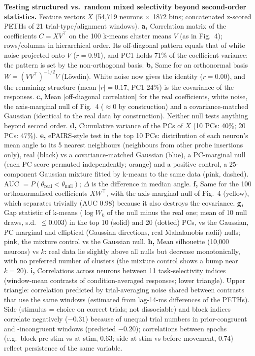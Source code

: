 \caption{\textbf{Testing structured vs.\ random mixed selectivity beyond second-order statistics.}
Feature vectors $X$ (54{,}719 neurons $\times$ 1872 bins; concatenated z-scored PETHs of 21 trial-type/alignment windows).
\textbf{a,} Correlation matrix of the coefficients $C = XV^\top$ on the 100 k-means cluster means $V$ (as in Fig.~4); rows/columns in hierarchical order. Its off-diagonal pattern equals that of white noise projected onto $V$ ($r = 0.91$), and PC1 holds 71\% of the coefficient variance: the pattern is set by the non-orthogonal basis.
\textbf{b,} Same for an orthonormal basis $W = (VV^\top)^{-1/2}V$ (L\"owdin). White noise now gives the identity ($r = 0.00$), and the remaining structure (mean $|r| = 0.17$, PC1 24\%) is the covariance of the responses.
\textbf{c,} Mean $|$off-diagonal correlation$|$ for the real coefficients, white noise, the axis-marginal null of Fig.~4 ($\approx 0$ by construction) and a covariance-matched Gaussian (identical to the real data by construction). Neither null tests anything beyond second order.
\textbf{d,} Cumulative variance of the PCs of $X$ (10 PCs: 40\%; 20 PCs: 47\%).
\textbf{e,} ePAIRS-style test in the top 10 PCs: distribution of each neuron's mean angle to its 5 nearest neighbours (neighbours from other probe insertions only), real (black) vs a covariance-matched Gaussian (blue), a PC-marginal null (each PC score permuted independently; orange) and a positive control, a 25-component Gaussian mixture fitted by k-means to the same data (pink, dashed). AUC $=P(\theta_\mathrm{real}<\theta_\mathrm{null})$; $\Delta$ is the difference in median angle.
\textbf{f,} Same for the 100 orthonormalised coefficients $XW^\top$, with the axis-marginal null of Fig.~4 (yellow), which separates trivially (AUC 0.98) because it also destroys the covariance.
\textbf{g,} Gap statistic of k-means ($\log W_k$ of the null minus the real one; mean of 10 null draws, s.d.\ $\le 0.003$) in the top 10 (solid) and 20 (dotted) PCs, vs the Gaussian, PC-marginal and elliptical (Gaussian directions, real Mahalanobis radii) nulls; pink, the mixture control vs the Gaussian null.
\textbf{h,} Mean silhouette (10{,}000 neurons) vs $k$: real data lie slightly above all nulls but decrease monotonically, with no preferred number of clusters (the mixture control shows a bump near $k=20$).
\textbf{i,} Correlations across neurons between 11 task-selectivity indices (window-mean contrasts of condition-averaged responses; lower triangle). Upper triangle: correlation predicted by trial-averaging noise shared between contrasts that use the same windows (estimated from lag-14-ms differences of the PETHs). Side (stimulus = choice on correct trials; not dissociable) and block indices correlate negatively ($-0.31$) because of unequal trial numbers in prior-congruent and -incongruent windows (predicted $-0.20$); correlations between epochs (e.g.\ block pre-stim vs at stim, 0.63; side at stim vs before movement, 0.74) reflect persistence of the same variable.
}

